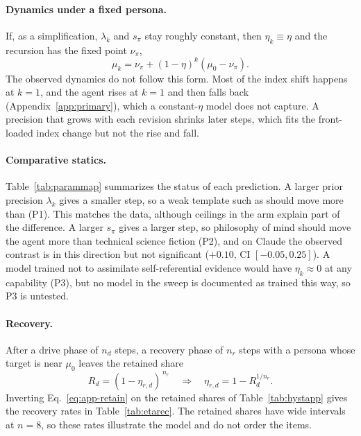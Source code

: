 \paragraph{Dynamics under a fixed persona.}
If, as a simplification, $\lambda_k$ and $s_\pi$ stay roughly constant, then $\eta_k\equiv\eta$ and the recursion has the fixed point $\nu_\pi$,
\begin{equation}
\mu_k=\nu_\pi+(1-\eta)^k(\mu_0-\nu_\pi).
\label{eq:app-dynamics}
\end{equation}
The observed dynamics do not follow this form.
Most of the \notes{} index shift happens at $k{=}1$, and the \soul{} agent rises at $k{=}1$ and then falls back (Appendix~\ref{app:primary}), which a constant-$\eta$ model does not capture.
A precision that grows with each revision shrinks later steps, which fits the front-loaded index change but not the \soul{} rise and fall.

\paragraph{Comparative statics.}
Table~\ref{tab:parammap} summarizes the status of each prediction.
A larger prior precision $\lambda_k$ gives a smaller step, so a weak template such as \notes{} should move more than \soul{} (P1).
This matches the data, although ceilings in the \soul{} arm explain part of the difference.
A larger $s_\pi$ gives a larger step, so philosophy of mind should move the agent more than technical science fiction (P2), and on Claude the observed contrast is in this direction but not significant ($+0.10$, CI $[-0.05,0.25]$).
A model trained not to assimilate self-referential evidence would have $\eta_k\approx0$ at any capability (P3), but no model in the sweep is documented as trained this way, so P3 is untested.

\paragraph{Recovery.}
After a drive phase of $n_d$ steps, a recovery phase of $n_r$ steps with a persona whose target is near $\mu_0$ leaves the retained share
\begin{equation}
R_d=(1-\eta_{r,d})^{\,n_r}\quad\Longrightarrow\quad \eta_{r,d}=1-R_d^{1/n_r}.
\label{eq:app-retain}
\end{equation}
Inverting Eq.~\eqref{eq:app-retain} on the retained shares of Table~\ref{tab:hystapp} gives the recovery rates in Table~\ref{tab:etarec}.
The retained shares have wide intervals at $n{=}8$, so these rates illustrate the model and do not order the items.

